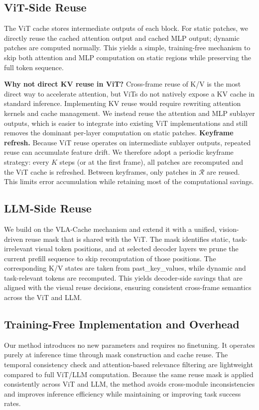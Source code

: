 \documentclass[lettersize,journal]{IEEEtran}
\begin{document}
\subsection{ViT-Side Reuse}
The ViT cache stores intermediate outputs of each block. For static patches, we directly reuse the cached attention output and cached MLP output; dynamic patches are computed normally. This yields a simple, training-free mechanism to skip both attention and MLP computation on static regions while preserving the full token sequence.

\textbf{Why not direct KV reuse in ViT?} Cross-frame reuse of K/V is the most direct way to accelerate attention, but ViTs do not natively expose a KV cache in standard inference. Implementing KV reuse would require rewriting attention kernels and cache management. We instead reuse the attention and MLP sublayer outputs, which is easier to integrate into existing ViT implementations and still removes the dominant per-layer computation on static patches.
\textbf{Keyframe refresh.} Because ViT reuse operates on intermediate sublayer outputs, repeated reuse can accumulate feature drift. We therefore adopt a periodic keyframe strategy: every $K$ steps (or at the first frame), all patches are recomputed and the ViT cache is refreshed. Between keyframes, only patches in $\mathcal{R}$ are reused. This limits error accumulation while retaining most of the computational savings.
\subsection{LLM-Side Reuse}
We build on the VLA-Cache mechanism and extend it with a unified, vision-driven reuse mask that is shared with the ViT. The mask identifies static, task-irrelevant visual token positions, and at selected decoder layers we prune the current prefill sequence to skip recomputation of those positions. The corresponding K/V states are taken from past\_key\_values, while dynamic and task-relevant tokens are recomputed. This yields decoder-side savings that are aligned with the visual reuse decisions, ensuring consistent cross-frame semantics across the ViT and LLM.

\subsection{Training-Free Implementation and Overhead}
Our method introduces no new parameters and requires no finetuning. It operates purely at inference time through mask construction and cache reuse. The temporal consistency check and attention-based relevance filtering are lightweight compared to full ViT/LLM computation. Because the same reuse mask is applied consistently across ViT and LLM, the method avoids cross-module inconsistencies and improves inference efficiency while maintaining or improving task success rates.
\end{document}
